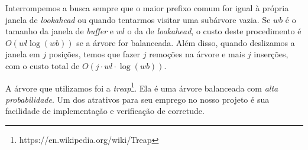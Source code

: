 \documentclass[]{article}
\begin{document}
Interrompemos a busca sempre que o maior prefixo comum for igual à própria janela de \textit{lookahead} ou quando tentarmos visitar uma subárvore vazia. Se $wb$ é o tamanho da janela de \textit{buffer} e $wl$ o da de \textit{lookahead}, o custo deste procedimento é $O(wl\log(wb))$ se a árvore for balanceada. Além disso, quando deslizamos a janela em $j$ posições, temos que fazer $j$ remoções na árvore e mais $j$ inserções, com o custo total de $O(j\cdot wl\cdot \log(wb))$.

A árvore que utilizamos foi a \textit{treap}\footnote{https://en.wikipedia.org/wiki/Treap}. Ela é uma árvore balanceada com \textit{alta probabilidade}. Um dos atrativos para seu emprego no nosso projeto é sua facilidade de implementação e verificação de corretude.
\end{document}
